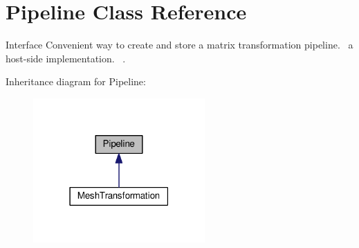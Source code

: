 \hypertarget{class_pipeline}{}\section{Pipeline Class Reference}
\label{class_pipeline}


Interface  Convenient way to create and store a matrix transformation pipeline.~\newline
 a host-\/side implementation.~\newline
.  




Inheritance diagram for Pipeline\+:
\nopagebreak
\begin{figure}[H]
\begin{center}
\leavevmode
\includegraphics[width=186pt]{class_pipeline__inherit__graph}
\end{center}
\end{figure}
